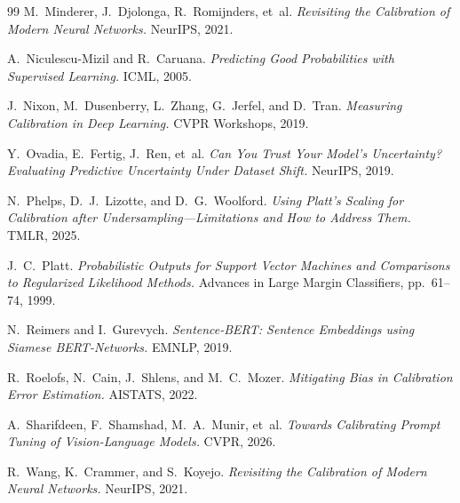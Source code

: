 \documentclass[11pt]{article}
\begin{document}
\begin{thebibliography}{99}
 M.~Minderer, J.~Djolonga, R.~Romijnders, et~al.
\newblock \textit{Revisiting the Calibration of Modern Neural Networks.} NeurIPS, 2021.

 A.~Niculescu-Mizil and R.~Caruana.
\newblock \textit{Predicting Good Probabilities with Supervised Learning.} ICML, 2005.

 J.~Nixon, M.~Dusenberry, L.~Zhang, G.~Jerfel, and D.~Tran.
\newblock \textit{Measuring Calibration in Deep Learning.} CVPR Workshops, 2019.

 Y.~Ovadia, E.~Fertig, J.~Ren, et~al.
\newblock \textit{Can You Trust Your Model's Uncertainty? Evaluating Predictive Uncertainty Under Dataset Shift.} NeurIPS, 2019.

 N.~Phelps, D.~J.~Lizotte, and D.~G.~Woolford.
\newblock \textit{Using Platt's Scaling for Calibration after Undersampling---Limitations and How to Address Them.} TMLR, 2025.

 J.~C.~Platt.
\newblock \textit{Probabilistic Outputs for Support Vector Machines and Comparisons to Regularized Likelihood Methods.} Advances in Large Margin Classifiers, pp.~61--74, 1999.

 N.~Reimers and I.~Gurevych.
\newblock \textit{Sentence-BERT: Sentence Embeddings using Siamese BERT-Networks.} EMNLP, 2019.

 R.~Roelofs, N.~Cain, J.~Shlens, and M.~C.~Mozer.
\newblock \textit{Mitigating Bias in Calibration Error Estimation.} AISTATS, 2022.

 A.~Sharifdeen, F.~Shamshad, M.~A.~Munir, et~al.
\newblock \textit{Towards Calibrating Prompt Tuning of Vision-Language Models.} CVPR, 2026.

 R.~Wang, K.~Crammer, and S.~Koyejo.
\newblock \textit{Revisiting the Calibration of Modern Neural Networks.} NeurIPS, 2021.

\end{thebibliography}

\clearpage

\appendix
\end{document}
